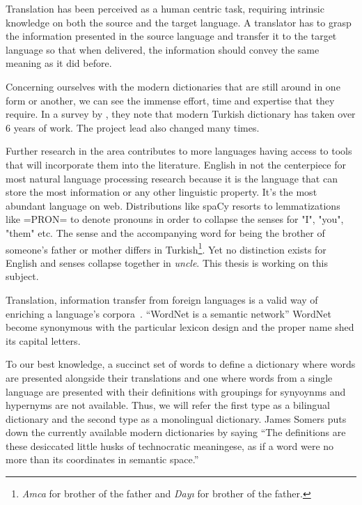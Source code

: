 Translation has been perceived as a human centric task, requiring intrinsic knowledge on both the source and the target language.
A translator has to grasp the information presented in the source language and transfer it to the target language so that when delivered, the information should convey the same meaning as it did before.

Concerning ourselves with the modern dictionaries that are still around in one form or another, we can see the immense effort, time and expertise that they require.
In a survey by \textcite{uzun_1945ten_1999}, they note that modern Turkish dictionary has taken over 6 years of work.
The project lead also changed many times.

Further research in the area contributes to more languages having access to tools that will incorporate them into the literature.
English in not the centerpiece for most natural language processing research because it is the language that can store the most information or any other linguistic property.
It's the most abundant language on web.
Distributions like spaCy resorts to lemmatizations like =PRON= to denote pronouns in order to collapse the senses for "I", "you", "them" etc\@.
The sense and the accompanying word for being the brother of someone's father or mother differs in Turkish\footnote{\emph{Amca} for brother of the father and \emph{Dayı} for brother of the father.}.
Yet no distinction exists for English and senses collapse together in \emph{uncle}.
This thesis is working on this subject.

Translation, information transfer from foreign languages is a valid way of enriching a language's corpora~\cite{ibrahim_usta_turkce_2006}.
\enquote{WordNet is a semantic network}\cite{fellbaum_wordnet_1998}
WordNet become synonymous with the particular lexicon design and the proper name shed its capital letters.

To our best knowledge, a succinct set of words to define a dictionary where words are presented alongside their translations and one where words from a single language are presented with their definitions with groupings for synyoynms and hypernyms are not available.
Thus, we will refer the first type as a bilingual dictionary and the second type as a monolingual dictionary.
James Somers puts down the currently available modern dictionaries by saying \enquote{The definitions are these desiccated little husks of technocratic meaningese, as if a word were no more than its coordinates in semantic space.}\cite{noauthor_youre_nodate}


